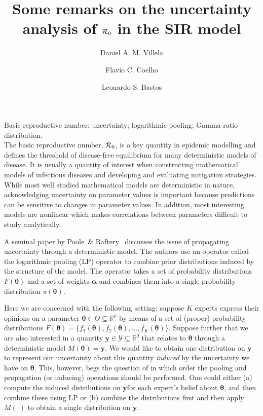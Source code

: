 \documentclass[11pt]{article}
\title{Some remarks on the uncertainty analysis of ${\cal R}_0$ in the SIR 
model}
\author[1]{Daniel A. M. Villela}
\author[2]{Flavio C. Coelho}
\author[1]{Leonardo S. Bastos}
\affil[2]{School of Applied Mathematics, Getulio Vargas Foundation (FGV), Brazil,\,\emailaddress{fccoelho@fgv.br}} %
\date{\vspace{-6ex}} %
\newcommand{\keywords}[1]{\noindent{\large{\bf Keywords:}} #1\\}
\begin{document}
\maketitle

\keywords{Basic reproductive number; uncertainty; logarithmic pooling; Gamma ratio distribution.}

The basic reproductive number, ${\cal R}_0$, is a key quantity in epidemic 
modelling and defines the threshold of disease-free equilibrium for many 
deterministic models of disease.
It is usually a quantity of interest when constructing mathematical models of infectious diseases and developing and evaluating mitigation strategies.
While most well studied mathematical models are deterministic in nature, acknowledging uncertainty on parameter values is important because predictions can be sensitive to changes in parameter values.
In addition, most interesting models are nonlinear which makes correlations between parameters difficult to study analytically.

A seminal paper by Poole~\& Raftery~\cite{poole2000} discusses the issue of propagating uncertainty through a deterministic model.
The authors use an operator called the logarithmic pooling (LP) operator to combine prior distributions induced by the structure of the model.
The operator takes a set of probability distributions $F(\boldsymbol\theta)$ and a set of weights $\boldsymbol\alpha$ and combines them into a single probability distribution $\pi(\boldsymbol\theta)$.

Here we are concerned with the following setting: suppose $K$ experts express their opinions on a parameter $\boldsymbol\theta \in \Theta \subseteq \mathbb{R}^{p}$ by means of a set of (proper) probability distributions $F(\boldsymbol\theta) = \{ f_1(\boldsymbol\theta), f_2(\boldsymbol\theta), \ldots, f_K(\boldsymbol\theta) \}$.
Suppose further that we are also interested in a quantity $\mathbf{y} \in  
\mathcal{Y}  \subseteq \mathbb{R}^{q}$ that relates to $\boldsymbol\theta $ 
through a deterministic model $M(\boldsymbol\theta) = \mathbf{y}$.
We would like to obtain one distribution on $\mathbf{y}$ to represent our uncertainty about this quantity \textit{induced} by the uncertainty we have on $\boldsymbol\theta$.
This, however, begs the question of in which order the pooling and propagation (or inducing) operations should be performed.
One could either (a) compute the induced distributions  on $\mathbf{y}$for each 
expert's belief about $\boldsymbol\theta$, and then combine these using LP or 
(b) combine the distributions first and then apply $M(\cdot)$ to obtain a single
distribution on $\mathbf{y}$.
\end{document}
